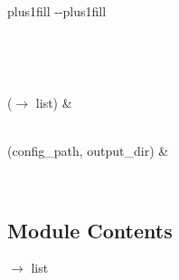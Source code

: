 \documentclass[letterpaper,10pt,english]{sphinxmanual}
\begin{document}
\begin{savenotes}
\sphinxatlongtablestart
\sphinxthistablewithglobalstyle
\sphinxthistablewithnovlinesstyle
\makeatletter
  \LTleft \@totalleftmargin plus1fill
  \LTright\dimexpr\columnwidth-\@totalleftmargin-\linewidth\relax plus1fill
\makeatother
\begin{longtable}{}
\sphinxtoprule
\endfirsthead

\\
\sphinxtoprule
\endhead

\sphinxbottomrule
{}\\
\endfoot

\endlastfoot
\sphinxtableatstartofbodyhook

\sphinxAtStartPar
{\hyperref[\detokenize{autoapi/generate_data_catalogue/index:generate_data_catalogue.load_indicator_config}]{}}(\(\rightarrow\) list)
&
\sphinxAtStartPar

\\
\sphinxhline
\sphinxAtStartPar
{\hyperref[\detokenize{autoapi/generate_data_catalogue/index:generate_data_catalogue.generate_catalogue_and_dictionary}]{}}(config\_path, output\_dir)
&
\sphinxAtStartPar

\\
\sphinxbottomrule
\end{longtable}
\sphinxtableafterendhook
\sphinxatlongtableend
\end{savenotes}


\subsection{Module Contents}
\label{\detokenize{autoapi/generate_data_catalogue/index:module-contents}}

\begin{fulllineitems}
\label{\detokenize{autoapi/generate_data_catalogue/index:generate_data_catalogue.load_indicator_config}}
\pysigstartsignatures
\pysiglinewithargsret
{}
{}
{{ $\rightarrow$ list}}
\pysigstopsignatures
\end{fulllineitems}
\end{document}
